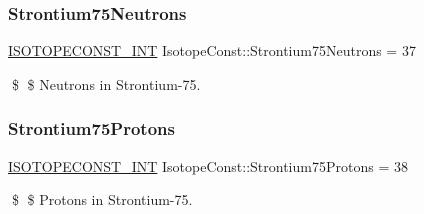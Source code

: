 \subsubsection{\texorpdfstring{Strontium75\+Neutrons}{Strontium75Neutrons}}
{\footnotesize\ttfamily \mbox{\hyperlink{group___isotope_const-_macros_ga5f18360b3e99483a35c32d789e62621c}{I\+S\+O\+T\+O\+P\+E\+C\+O\+N\+S\+T\+\_\+\+I\+NT}} Isotope\+Const\+::\+Strontium75\+Neutrons = 37}

\$ \$ Neutrons in Strontium-\/75. \mbox{\label{group___isotope_const-_strontium-_sr75_gae2c95d241014e285fd0d68b3cc1cb367}} 
\subsubsection{\texorpdfstring{Strontium75\+Protons}{Strontium75Protons}}
{\footnotesize\ttfamily \mbox{\hyperlink{group___isotope_const-_macros_ga5f18360b3e99483a35c32d789e62621c}{I\+S\+O\+T\+O\+P\+E\+C\+O\+N\+S\+T\+\_\+\+I\+NT}} Isotope\+Const\+::\+Strontium75\+Protons = 38}

\$ \$ Protons in Strontium-\/75. 